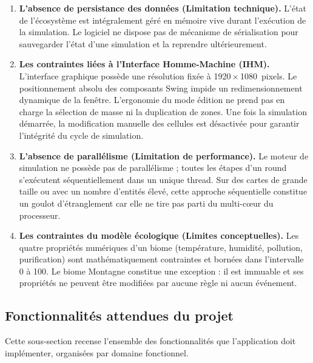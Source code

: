 \begin{enumerate}
  \item \textbf{L'absence de persistance des données (Limitation technique).} L'état de l'écosystème est intégralement géré en mémoire vive durant l'exécution de la simulation. Le logiciel ne dispose pas de mécanisme de sérialisation pour sauvegarder l'état d'une simulation et la reprendre ultérieurement.

  \item \textbf{Les contraintes liées à l'Interface Homme-Machine (IHM).} L'interface graphique possède une résolution fixée à 1920\,$\times$\,1080~pixels. Le positionnement absolu des composants Swing impide un redimensionnement dynamique de la fenêtre. L'ergonomie du mode édition ne prend pas en charge la sélection de masse ni la duplication de zones. Une fois la simulation démarrée, la modification manuelle des cellules est désactivée pour garantir l'intégrité du cycle de simulation.
  \item \textbf{L'absence de parallélisme (Limitation de performance).} Le moteur de simulation ne possède pas de parallélisme ; toutes les étapes d'un round s'exécutent séquentiellement dans un unique thread. Sur des cartes de grande taille ou avec un nombre d'entités élevé, cette approche séquentielle constitue un goulot d'étranglement car elle ne tire pas parti du multi-cœur du processeur.

  \item \textbf{Les contraintes du modèle écologique (Limites conceptuelles).} Les quatre propriétés numériques d'un biome (température, humidité, pollution, purification) sont mathématiquement contraintes et bornées dans l'intervalle 0 à 100. Le biome Montagne constitue une exception : il est immuable et ses propriétés ne peuvent être modifiées par aucune règle ni aucun événement.
\end{enumerate}


\subsection{Fonctionnalités attendues du projet}
\label{subsec:fonctionnalites}

Cette sous-section recense l'ensemble des fonctionnalités que l'application doit
implémenter, organisées par domaine fonctionnel.

